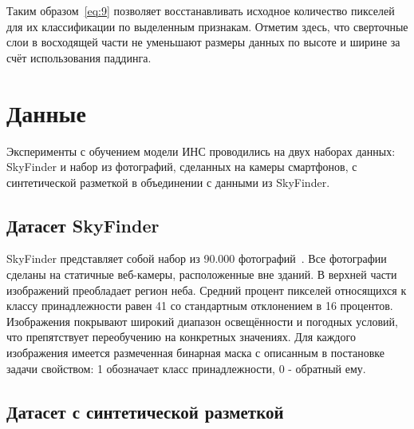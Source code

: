 Таким образом~\eqref{eq:9} позволяет восстанавливать исходное количество пикселей для их классификации по выделенным признакам.
Отметим здесь, что сверточные слои в восходящей части не уменьшают размеры данных по высоте и ширине за счёт использования паддинга.

\section{Данные}

Эксперименты с обучением модели ИНС проводились на двух наборах данных: SkyFinder и набор из фотографий, сделанных на камеры смартфонов,
с синтетической разметкой в объединении с данными из SkyFinder.

\subsection{Датасет SkyFinder}

SkyFinder представляет собой набор из 90.000 фотографий~\autocite{mihail2016sky}.
Все фотографии сделаны на статичные веб-камеры, расположенные вне зданий.
В верхней части изображений преобладает регион неба.
Средний процент пикселей относящихся к классу принадлежности равен 41 со стандартным отклонением в 16 процентов.
Изображения покрывают широкий диапазон освещённости и погодных условий, что препятствует переобучению на конкретных значениях.
Для каждого изображения имеется размеченная бинарная маска с описанным в постановке задачи свойством: 1 обозначает класс принадлежности, 0 - обратный ему.

\subsection{Датасет с синтетической разметкой}

\Conc

\printbibliography[%
    heading=bibintoc%
]


